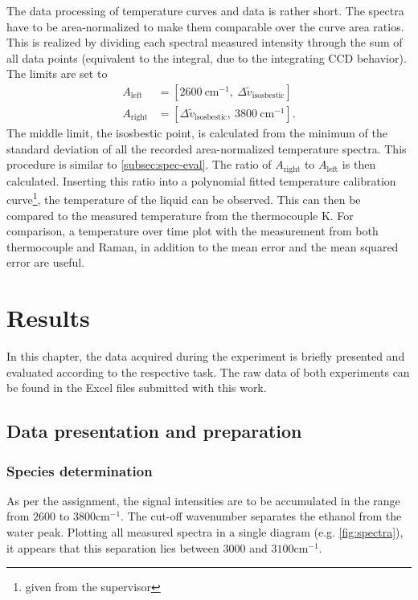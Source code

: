 The data processing of temperature curves and data is rather short. The spectra have to be area-normalized to make them comparable over the curve area ratios. This is realized by dividing each spectral measured intensity through the sum of all data points (equivalent to the integral, due to the integrating CCD behavior). The limits are set to
\begin{align}
    A_\mathrm{left}&= [2600~\mathrm{cm^{-1}},~\Delta \tilde{v}_\mathrm{isosbestic}]\nonumber \\
    A_\mathrm{right}&= [\Delta \tilde{v}_\mathrm{isosbestic},~3800~\mathrm{cm^{-1}}]\nonumber .
\end{align}
The middle limit, the isosbestic point, is calculated from the minimum of the standard deviation of all the recorded area-normalized temperature spectra. This procedure is similar to \autoref{subsec:spec-eval}. The ratio of $A_\mathrm{right}$ to $A_\mathrm{left}$ is then calculated. Inserting this ratio into a polynomial fitted temperature calibration curve\footnote{given from the supervisor}, the temperature of the liquid can be observed. This can then be compared to the measured temperature from the thermocouple K. For comparison, a temperature over time plot with the measurement from both thermocouple and Raman, in addition to the mean error and the mean squared error are useful.

\chapter{Results}
\label{chap:results}

In this chapter, the data acquired during the experiment is briefly presented and evaluated according to the respective task. The raw data of both experiments can be found in the Excel files submitted with this work.

\section{Data presentation and preparation}

\subsection*{Species determination}
\label{subsec:spec-prep}

As per the assignment, the signal intensities are to be accumulated in the range from $2600$ to $3800 \mathrm{cm^{-1}}$. The cut-off wavenumber separates the ethanol from the water peak. Plotting all measured spectra in a single diagram (e.g. \autoref{fig:spectra}), it appears that this separation lies between $3000$ and $3100 \mathrm{cm^{-1}}$.


